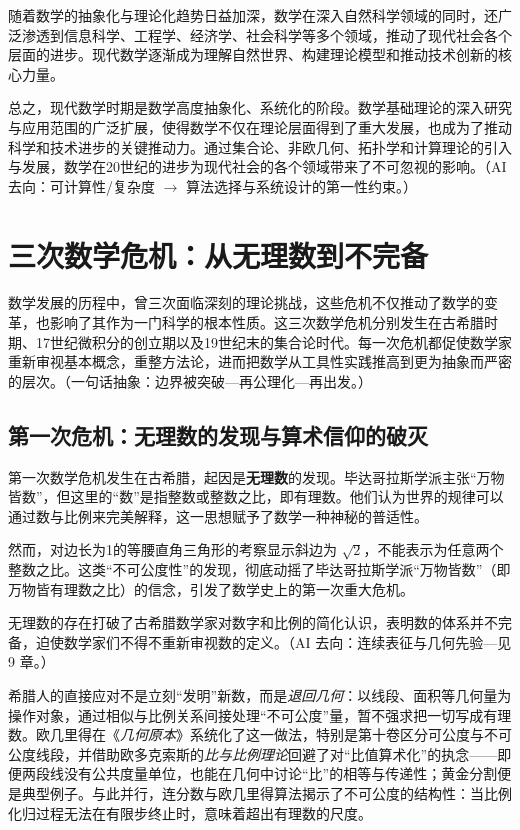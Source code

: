 随着数学的抽象化与理论化趋势日益加深，数学在深入自然科学领域的同时，还广泛渗透到信息科学、工程学、经济学、社会科学等多个领域，推动了现代社会各个层面的进步。现代数学逐渐成为理解自然世界、构建理论模型和推动技术创新的核心力量。

总之，现代数学时期是数学高度抽象化、系统化的阶段。数学基础理论的深入研究与应用范围的广泛扩展，使得数学不仅在理论层面得到了重大发展，也成为了推动科学和技术进步的关键推动力。通过集合论、非欧几何、拓扑学和计算理论的引入与发展，数学在20世纪的进步为现代社会的各个领域带来了不可忽视的影响。{（AI 去向：可计算性/复杂度 $\rightarrow$ 算法选择与系统设计的第一性约束。）}

\section{ 三次数学危机：从无理数到不完备}
数学发展的历程中，曾三次面临深刻的理论挑战，这些危机不仅推动了数学的变革，也影响了其作为一门科学的根本性质。这三次数学危机分别发生在古希腊时期、17世纪微积分的创立期以及19世纪末的集合论时代。每一次危机都促使数学家重新审视基本概念，重整方法论，进而把数学从工具性实践推高到更为抽象而严密的层次。{（一句话抽象：边界被突破—再公理化—再出发。）}

\subsection{第一次危机：无理数的发现与算术信仰的破灭}
第一次数学危机发生在古希腊，起因是{\bf 无理数}的发现。毕达哥拉斯学派主张“万物皆数”，但这里的“数”是指整数或整数之比，即有理数。他们认为世界的规律可以通过数与比例来完美解释，这一思想赋予了数学一种神秘的普适性。

然而，对边长为1的等腰直角三角形的考察显示斜边为 $\sqrt{2}$，不能表示为任意两个整数之比。这类“不可公度性”的发现，彻底动摇了毕达哥拉斯学派“万物皆数”（即万物皆有理数之比）的信念，引发了数学史上的第一次重大危机。

无理数的存在打破了古希腊数学家对数字和比例的简化认识，表明数的体系并不完备，迫使数学家们不得不重新审视数的定义。{（AI 去向：连续表征与几何先验—见 9 章。）}

希腊人的直接应对不是立刻“发明”新数，而是{\itshape 退回几何}：以线段、面积等几何量为操作对象，通过相似与比例关系间接处理“不可公度”量，暂不强求把一切写成有理数。欧几里得在《\emph{几何原本}》系统化了这一做法，特别是第十卷区分可公度与不可公度线段，并借助欧多克索斯的{\itshape 比与比例理论}回避了对“比值算术化”的执念——即便两段线没有公共度量单位，也能在几何中讨论“比”的相等与传递性；黄金分割便是典型例子。与此并行，连分数与欧几里得算法揭示了不可公度的结构性：当比例化归过程无法在有限步终止时，意味着超出有理数的尺度。

